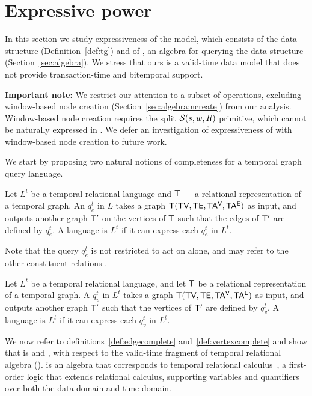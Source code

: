 \section{Expressive power}
\label{sec:formal}

In this section we study expressiveness of the \tg model, which
consists of the \tg data structure (Definition~\ref{def:tg}) and of
\tga, an algebra for querying the data structure
(Section~\ref{sec:algebra}). We stress that ours is a valid-time data
model that does not provide transaction-time and bitemporal support.

{\bf Important note:} We restrict our attention to a subset of \tga
operations, excluding window-based node creation
(Section~\ref{sec:algebra:ncreate}) from our analysis.  Window-based
node creation requires the split $\mathcal{S}(s,w,R)$ primitive, which
cannot be naturally expressed in \tra.  We defer an investigation of
expressiveness of \tga with window-based node creation to future work.

We start by proposing two natural notions of completeness for a
temporal graph query language.

\begin{definition}
  Let $L^t$ be a temporal relational language and $\mathsf{T}$ --- a
  relational representation of a temporal graph.  An \edgeq $q^t_e$ in
  $L$ takes a graph $\mathsf{T} (\textsf{TV}, \textsf{TE}, \mathsf{TA^{V}}, \mathsf{TA^{E}})$ as input, and
  outputs another graph $\mathsf{T}'$ on the vertices of $\mathsf{T}$ such that
  the edges of $\mathsf{T}'$ are defined by $q^t_e$.  A language is
  $L^t$-\edgec if it can express each $q^t_e$ in $L^t$.
  \label{def:edgecomplete}
\end{definition}

Note that the query $q^t_e$ is not restricted to act on \te alone, and
may refer to the other constituent relations \tve.

\begin{definition}
  Let $L^t$ be a temporal relational language, and let $\mathsf{T}$ be a
  relational representation of a temporal graph.  A \vertexq $q^t_v$
  in $L^t$ takes a graph $\mathsf{T} (\textsf{TV}, \textsf{TE}, \mathsf{TA^{V}}, \mathsf{TA^{E}})$ as input, and
  outputs another graph $\mathsf{T}'$ such that the vertices of $\mathsf{T}'$ are
  defined by $q^t_v$. A language is $L^t$-\vertexc if it can express
  each $q^t_v$ in $L^t$.
\label{def:vertexcomplete}
\end{definition}

We now refer to definitions~\ref{def:edgecomplete}
and~\ref{def:vertexcomplete} and show that \tga is \edgec and
\vertexc, with respect to the valid-time fragment of temporal
relational algebra (\tra).  \tra is an algebra that corresponds to
temporal relational calculus~\cite{DBLP:reference/db/ChomickiT09b}, a
first-order logic that extends relational calculus, supporting
variables and quantifiers over both the data domain and time domain.

